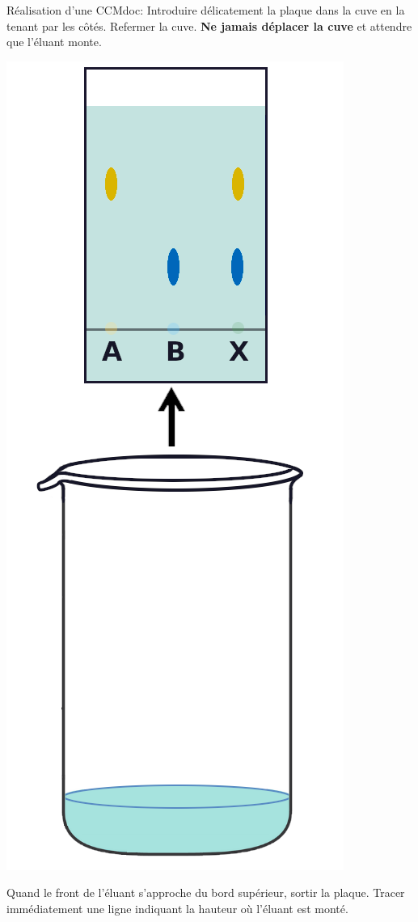 \begin{doc}{Réalisation d'une CCM}{doc:}
{    \vspace*{-12pt}
    Introduire délicatement la plaque dans la cuve en la tenant par les côtés.
    Refermer la cuve.
    \textbf{Ne jamais déplacer la cuve} et attendre que l'éluant monte.
  }{
    \begin{center}
      \includegraphics[height=0.25\textheight]{images/chimie/CCM/CCM_etapes_retrait}
    \end{center}
    
    \vspace*{-12pt}
    Quand le front de l'éluant s'approche du bord supérieur, sortir la plaque.
    Tracer immédiatement une ligne indiquant la hauteur où l'éluant est monté.
  }
\end{doc}



